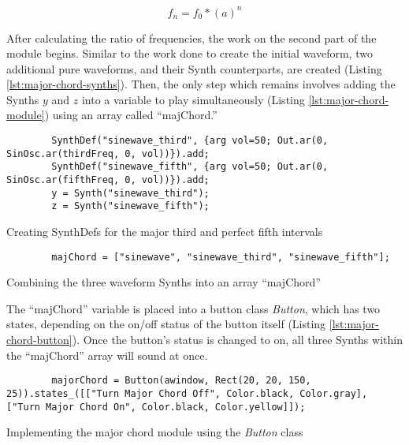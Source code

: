 \begin{equation}
	f_n = f_0 * (a)^n
	\label{eq:equal-temperament-eq}
\end{equation}

After calculating the ratio of frequencies, the work on the second part of the module begins. Similar to the work done to create the initial waveform, two additional pure waveforms, and their Synth counterparts, are created (Listing \ref{lst:major-chord-synths}). Then, the only step which remains involves adding the Synths $y$ and $z$ into a variable to play simultaneously (Listing \ref{lst:major-chord-module}) using an array called ``majChord.''

\begin{listing}
	\begin{lstlisting}
		SynthDef("sinewave_third", {arg vol=50; Out.ar(0, SinOsc.ar(thirdFreq, 0, vol))}).add;
		SynthDef("sinewave_fifth", {arg vol=50; Out.ar(0, SinOsc.ar(fifthFreq, 0, vol))}).add;
		y = Synth("sinewave_third");
		z = Synth("sinewave_fifth");
	\end{lstlisting}
	\label{lst:major-chord-synths}
	\caption{Creating SynthDefs for the major third and perfect fifth intervals}	
\end{listing}

\begin{listing}
	\begin{lstlisting}
		majChord = ["sinewave", "sinewave_third", "sinewave_fifth"];
	\end{lstlisting}
	\label{lst:major-chord-module}
	\caption{Combining the three waveform Synths into an array ``majChord''}
\end{listing}

The ``majChord'' variable is placed into a button class \textit{Button}, which has two states, depending on the on/off status of the button itself (Listing \ref{lst:major-chord-button}). Once the button's status is changed to on, all three Synths within the ``majChord'' array will sound at once.

\begin{listing}
	\begin{lstlisting}
		majorChord = Button(awindow, Rect(20, 20, 150, 25)).states_([["Turn Major Chord Off", Color.black, Color.gray], ["Turn Major Chord On", Color.black, Color.yellow]]);	
	\end{lstlisting}
	\label{lst:major-chord-button}
	\caption{Implementing the major chord module using the \textit{Button} class}
\end{listing}

